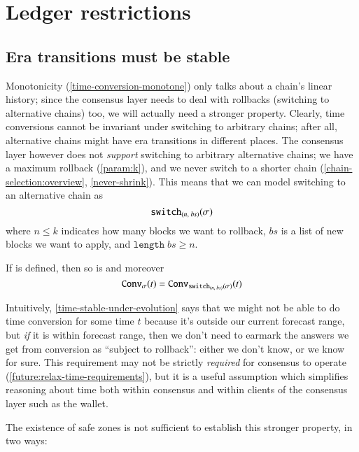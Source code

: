 \section{Ledger restrictions}
\label{time:ledgerrestrictions}

\subsection{Era transitions must be stable}

Monotonicity (\cref{time-conversion-monotone}) only talks about a chain's linear
history; since the consensus layer needs to deal with rollbacks (switching to
alternative chains) too, we will actually need a stronger property. Clearly,
time conversions cannot be invariant under switching to arbitrary chains; after
all, alternative chains might have era transitions in different places. The
consensus layer however does not \emph{support} switching to arbitrary
alternative chains; we have a maximum rollback (\cref{param:k}), and we never
switch to a shorter chain (\cref{chain-selection:overview},
\cref{never-shrink}). This means that we can model switching to an alternative
chain as $$\mathtt{switch}_{(\mathit{n},\;\mathit{bs})}(\sigma)$$ where $n \le k$ indicates how many blocks we
want to rollback, $\mathit{bs}$ is a list of new blocks we want to apply, and
$\mathtt{length} \; \mathit{bs} \ge n$.

\begin{property}
\label{time-stable-under-evolution}
If  is defined, then so is
and moreover
\begin{equation*}
  \mathtt{Conv}_{\sigma}(t)
= \mathtt{Conv}_{\mathtt{switch}_{(\mathit{n},\;\mathit{bs})}(\sigma)}(t)
\end{equation*}
\end{property}

Intuitively, \cref{time-stable-under-evolution} says that we might not be able
to do time conversion for some time $t$ because it's outside our current forecast
range, but \emph{if} it is within forecast range, then we don't need to earmark
the answers we get from conversion as ``subject to rollback'': either we don't
know, or we know for sure. This requirement may not be strictly \emph{required}
for consensus to operate (\cref{future:relax-time-requirements}), but it is
a useful assumption which simplifies reasoning about time both within consensus
and within clients of the consensus layer such as the wallet.

The existence of safe zones is not sufficient to establish this stronger
property, in two ways:


